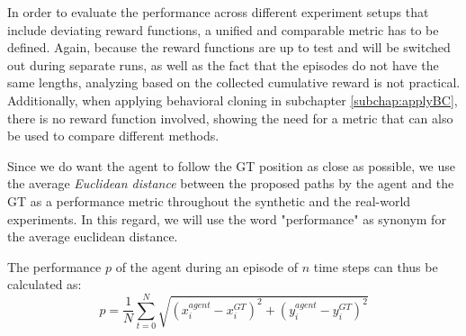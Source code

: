 In order to evaluate the performance across different experiment setups that include deviating reward functions, a unified and comparable metric has to be defined. Again, because the reward functions are up to test and will be switched out during separate runs, as well as the fact that the episodes do not have the same lengths, analyzing based on the collected cumulative reward is not practical. Additionally, when applying behavioral cloning in subchapter \ref{subchap:applyBC}, there is no reward function involved, showing the need for a metric that can also be used to compare different methods.
\par
Since we do want the agent to follow the GT position as close as possible, we use the average \textit{Euclidean distance} between the proposed paths by the agent and the GT as a performance metric throughout the synthetic and the real-world experiments. In this regard, we will use the word "performance" as synonym for the average euclidean distance.
\par
The performance $p$ of the agent during an episode of $n$ time steps can thus be calculated as:
\begin{equation}
    p = \frac{1}{N} \sum_{t=0}^{N}\sqrt{(x^{agent}_i - x^{GT}_i)^2 + (y^{agent}_i - y^{GT}_i)^2}
    \label{eq:euclid}
\end{equation}

